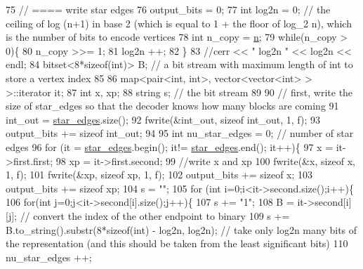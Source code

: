 \begin{DoxyCode}
75   \textcolor{comment}{// ==== write star edges}
76   output\_bits = 0;
77   \textcolor{keywordtype}{int} log2n = 0; \textcolor{comment}{// the ceiling of log (n+1) in base 2 (which is equal to 1 + the floor of log\_2 n), which
       is the number of bits to encode vertices}
78   \textcolor{keywordtype}{int} n\_copy = \hyperlink{classmarked__graph__compressed_a8d841016ddb11cfd33748c8deb6277ba}{n};
79   \textcolor{keywordflow}{while}(n\_copy > 0)\{
80     n\_copy >>= 1;
81     log2n ++;
82   \}
83   \textcolor{comment}{//cerr << " log2n " << log2n << endl;}
84   bitset<8*sizeof(int)> B; \textcolor{comment}{// a bit stream with maximum length of int to store a vertex index}
85 
86   map<pair<int, int>, vector<vector<int> > >::iterator it;
87   \textcolor{keywordtype}{int} x, xp;
88   \textcolor{keywordtype}{string} s; \textcolor{comment}{// the bit stream}
89 
90   \textcolor{comment}{// first, write the size of star\_edges so that the decoder knows how many blocks are coming}
91   int\_out = \hyperlink{classmarked__graph__compressed_a7df5779d313486644132bd816937f532}{star\_edges}.size();
92   fwrite(&int\_out, \textcolor{keyword}{sizeof} int\_out, 1, f);
93   output\_bits += \textcolor{keyword}{sizeof} int\_out;
94 
95   \textcolor{keywordtype}{int} nu\_star\_edges = 0; \textcolor{comment}{// number of star edges }
96   \textcolor{keywordflow}{for} (it = \hyperlink{classmarked__graph__compressed_a7df5779d313486644132bd816937f532}{star\_edges}.begin(); it!= \hyperlink{classmarked__graph__compressed_a7df5779d313486644132bd816937f532}{star\_edges}.end(); it++)\{
97     x = it->first.first;
98     xp = it->first.second;
99     \textcolor{comment}{//write x and xp}
100     fwrite(&x, \textcolor{keyword}{sizeof} x, 1, f);
101     fwrite(&xp, \textcolor{keyword}{sizeof} xp, 1, f);
102     output\_bits += \textcolor{keyword}{sizeof} x;
103     output\_bits += \textcolor{keyword}{sizeof} xp;
104     s = \textcolor{stringliteral}{""};
105     \textcolor{keywordflow}{for} (\textcolor{keywordtype}{int} i=0;i<it->second.size();i++)\{
106       \textcolor{keywordflow}{for}(\textcolor{keywordtype}{int} j=0;j<it->second[i].size();j++)\{
107         s += \textcolor{stringliteral}{"1"};
108         B = it->second[i][j]; \textcolor{comment}{// convert the index of the other endpoint to binary}
109         s += B.to\_string().substr(8*\textcolor{keyword}{sizeof}(\textcolor{keywordtype}{int}) - log2n, log2n); \textcolor{comment}{// take only log2n many bits of the
       representation (and this should be taken from the least significant bits)}
110         nu\_star\_edges ++;

\end{DoxyCode}
